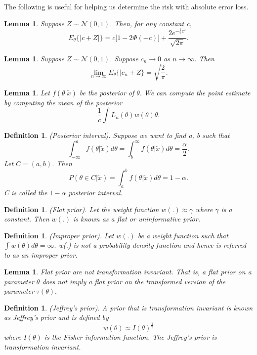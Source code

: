 \documentclass[twoside]{article}
\newtheorem{lemma}[theorem]{Lemma}
\newtheorem{definition}[theorem]{Definition}
\begin{document}
The following is useful for helping us determine the risk with absolute error loss.
\begin{lemma}Suppose $Z \sim \mathcal{N}(0,1)$. Then, for any constant c, 
$$
E_{\theta}\{|c + Z|\} = c\bigg[1 - 2\Phi(-c) \bigg] + \frac{2e^{-\frac{1}{2}c^2}}{\sqrt{2\pi}}.
$$
\end{lemma}

\begin{lemma}Suppose $Z \sim \mathcal{N}(0,1)$. Suppose $c_n \rightarrow 0$ as $n \rightarrow \infty$. Then 
$$
\lim_{n \rightarrow \infty}E_{\theta}\{|c_n + Z\} = \sqrt{\frac{2}{\pi}}.
$$
\end{lemma}


\begin{lemma}Let $f(\theta|\tilde{x})$ be the posterior of $\theta.$ We can compute the point estimate by computing the mean of the posterior 
$$
\frac{1}{c}\int L_n(\theta)w(\theta)\theta.
$$
\end{lemma}

\begin{definition}(Posterior interval). Suppose we want to find a, b such that 
$$
\int_{-\infty}^{a}f(\theta|\tilde{x})d\theta = \int_{b}^{\infty}f(\theta|\tilde{x})d\theta = \frac{\alpha}{2}.
$$
Let $C = (a,b)$. Then
$$
P(\theta \in C|\tilde{x}) = \int_{a}^{b}f(\theta|\tilde{x})d\theta = 1 - \alpha.
$$
C is called the $1 - \alpha$ posterior interval.
\end{definition}

\begin{definition}(Flat prior). Let the weight function $w(.) \approx \gamma$ where $\gamma$ is a constant. Then $w(.)$ is known as a flat or uninformative prior.
\end{definition}

\begin{definition}(Improper prior). Let $w(.)$ be a weight function such that $\int w(\theta)d\theta = \infty.$ w(.) is not a probability density function and hence is referred to as an improper prior.
\end{definition}

\begin{lemma}Flat prior are not transformation invariant. That is, a flat prior on a parameter $\theta$ does not imply a flat prior on the transformed version of the parameter $\tau(\theta).$
\end{lemma}

\begin{definition}(Jeffrey's prior). A prior that is transformation invariant is known as Jeffrey's prior and is defined by 
$$
w(\theta) \approx I(\theta)^{\frac{1}{2}}
$$
where $I(\theta)$ is the Fisher information function. The Jeffrey's prior is transformation invariant.
\end{definition}
\end{document}
